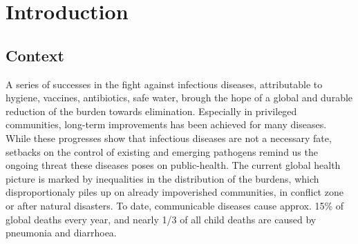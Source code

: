 \chapter{Introduction} %
 \section{Context}
A series of successes in the fight against infectious diseases, attributable to \eg hygiene, vaccines, antibiotics, safe water, brough the hope of a global and durable reduction of the burden towards elimination. Especially in privileged communities, long-term improvements has been achieved for many diseases. While these progresses show that infectious diseases are not a necessary fate, setbacks on the control of existing and emerging pathogens remind us the ongoing threat these diseases poses on public-health. The current global health picture is marked by inequalities in the distribution of the burdens, which disproportionaly piles up on already impoverished communities, in conflict zone or after natural disasters. To date, communicable diseases cause approx. 15\% of global deaths every year\cite[][Table 1, excl. non- transmissible neonatal and maternal diseases and nutritional diseases; pre-\textsc{covid}-19 estimates]{Roth:GlobalRegionalNational:2018}, and nearly 1/3 of all child deaths are caused by pneumonia and diarrhoea\cite[][2\textsc{M} under 5 deaths every year.]{WHO:EndingPreventableChild:2013}.
 
